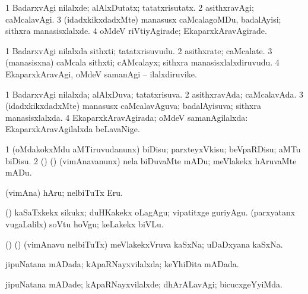 \bentry
{} 
\gl{\gu}
\expl{}
\bmng
\bnum
\num{1} BadarxvAgi nilalxde; alAlxDutatx; tatatxrisutatx. 
\num{2} asithxravAgi; caMcalavAgi. 
\num{3} (idadxkikxdadxMte) manasusx caMcalagoMDu, badalAyisi; sithxra manasisxlalxde. 
\num{4} oMdeV riVtiyAgirade; EkaparxkAravAgirade. 
\enum
\emng
\eentry

\bentry
{} 
\gl{\nA}
\expl{}
\bmng
\bnum
\num{1} BadarxvAgi nilalxda sithxti; tatatxrisuvudu. 
\num{2} asithxrate; caMcalate. 
\num{3} (manasisxna) caMcala sithxti; cAMcalayx; sithxra manasisxlalxdiruvudu. 
\num{4} EkaparxkAravAgi, oMdeV samanAgi -- ilalxdiruvike. 
\enum
\emng
\eentry

\bentry
{} 
\gl{\gu}
\bmng
\bnum
\num{1} BadarxvAgi nilalxda; alAlxDuva; tatatxrisuva. 
\num{2} asithxravAda; caMcalavAda. 
\num{3} (idadxkikxdadxMte) manasusx caMcalavAguva; badalAyisuva; sithxra manasisxlalxda. 
\num{4} EkaparxkAravAgirada; oMdeV samanAgilalxda:  EkaparxkAravAgilalxda beLavaNige. 
\enum
\emng
\eentry

\bentry
{} 
\gl{\kirx}

\gl{\sakirx}
\expl{}
\bmng
\bnum
\num{1} (oMdakokxMdu aMTiruvudanunx) biDisu; parxteyxVkisu; beVpaRDisu; aMTu biDisu. 
\num{2} (\vAyA) (\AmA) (vimAnavanunx) nela biDuvaMte mADu; meVlakekx hAruvaMte mADu. 
\enum
\emng

\noindent
\gl{\akirx}
\expl{}
\bmng
(vimAna) hAru; nelbiTuTx Eru. 
\emng

\noindent
\gl{\pagu}
\expl{}
\bmng
{} (\AmA) 
\banum
{} kaSaTxkekx sikukx; duHKakekx oLagAgu; vipatitxge guriyAgu. 
 (parxyatanx \mo vugaLalilx) soVtu hoVgu; keLakekx biVLu. 
\eanum
\emng
\eentry

\bentry
{} 
\gl{\nA}
\expl{}
\bmng
(\vAyA) (\AmA) (vimAnavu nelbiTuTx) meVlakekxVruva kaSxNa; uDaDxyana kaSxNa. 
\emng
\eentry

\bentry
{} 
\gl{\gu}
\expl{}
\bmng
jipuNatana mADada; kApaRNayxvilalxda; keYhiDita mADada. 
\emng
\eentry

\bentry
{} 
\gl{\kirxvi}
\expl{}
\bmng
jipuNatana mADade; kApaRNayxvilalxde; dhArALavAgi; bicucxgeYyiMda. 
\emng
\eentry

